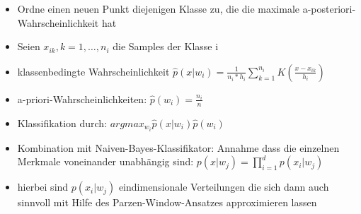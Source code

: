 \documentclass{article} %
\begin{document}
\begin{itemize}
\begin{itemize}
			\item Ordne einen neuen Punkt diejenigen Klasse zu, die die maximale a-posteriori-Wahrscheinlichkeit hat
			\item Seien $x_{ik},k=1,\dots,n_i$ die Samples der Klasse i
			\item klassenbedingte Wahrscheinlichkeit $\hat{p}(x|w_i) = \frac{1}{n_i*h_i}\sum_{k=1}^{n_i}K(\frac{x-x_{ik}}{h_i})$
			\item a-priori-Wahrscheinlichkeiten: $\hat{p}(w_i) = \frac{n_i}{n}$
			\item Klassifikation durch: $arg max_{w_i}\hat{p}(x|w_i)\hat{p}(w_i)$
			\item Kombination mit Naiven-Bayes-Klassifikator: Annahme dass die einzelnen Merkmale voneinander unabhängig sind: $p(x|w_j) = \prod_{i=1}^{d}p(x_i|w_j)$
			\item hierbei sind $p(x_i|w_j)$ eindimensionale Verteilungen die sich dann auch sinnvoll mit Hilfe des Parzen-Window-Ansatzes approximieren lassen
		\end{itemize}
		\end{itemize}
\end{document}
